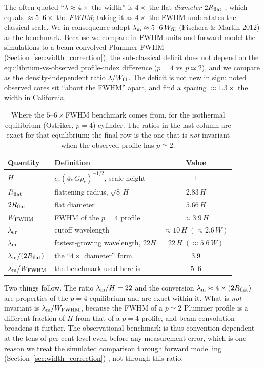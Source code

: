 \documentclass[usenatbib,twoside,twocolumn]{mnras}
\begin{document}
\smallskip The often-quoted ``$\lambda\approx4\times$ the width'' is $4\times$ the flat \emph{diameter} $2R_{\rm flat}$ \citep{Inutsuka1992}, which equals $\approx5$--$6\times$ the \emph{FWHM}; taking it as $4\times$ the FWHM understates the classical scale. We in consequence adopt $\lambda_{\rm m}\approx5$--$6\,W_{\rm fil}$ (Fischera \& Martin 2012) as the benchmark. Because we compare in FWHM units and forward-model the simulations to a beam-convolved Plummer FWHM (Section~\ref{sec:width_correction}), the sub-classical deficit does not depend on the equilibrium-vs-observed profile-index difference ($p=4$ vs $p\simeq2$), and we compare as the density-independent ratio $\lambda/W_{\rm fil}$. The deficit is not new in sign: \citet{Fischera2012} noted observed cores sit ``about the FWHM'' apart, and \citet{Zhang2023cal} find a spacing $\approx1.3\times$ the width in California.

\begin{table}
\caption{Where the $5$--$6\times$FWHM benchmark comes from, for the isothermal equilibrium (Ostriker, $p=4$) cylinder. The ratios in the last column are exact for that equilibrium; the final row is the one that is \emph{not} invariant when the observed profile has $p\simeq2$.}
\label{tab:benchmark}
\footnotesize
\setlength{\tabcolsep}{4pt}
\begin{tabular}{llc}
\toprule
Quantity & Definition & Value \\
\midrule
$H$ & $c_s(4\pi G\rho_c)^{-1/2}$, scale height & $1$ \\
$R_{\rm flat}$ & flattening radius, $\sqrt{8}\,H$ & $2.83\,H$ \\
$2R_{\rm flat}$ & flat diameter & $5.66\,H$ \\
$W_{\rm FWHM}$ & FWHM of the $p=4$ profile & $\approx3.9\,H$ \\
$\lambda_{\rm cr}$ & cutoff wavelength & $\approx10\,H\;(\approx2.6\,W)$ \\
$\lambda_{\rm m}$ & fastest-growing wavelength, $22H$ & $22\,H\;(\approx5.6\,W)$ \\
\midrule
$\lambda_{\rm m}/(2R_{\rm flat})$ & the ``$4\times$ diameter'' form & $3.9$ \\
$\lambda_{\rm m}/W_{\rm FWHM}$ & the benchmark used here is & $5$--$6$ \\
\bottomrule
\end{tabular}
\end{table}

Two things follow. The ratio $\lambda_{\rm m}/H=22$ and the conversion $\lambda_{\rm m}\approx4\times(2R_{\rm flat})$ are properties of the $p=4$ equilibrium and are exact within it. What is \emph{not} invariant is $\lambda_{\rm m}/W_{\rm FWHM}$, because the FWHM of a $p\simeq2$ Plummer profile is a different fraction of $H$ from that of a $p=4$ profile, and beam convolution broadens it further. The observational benchmark is thus convention-dependent at the tens-of-per-cent level even before any measurement error, which is one reason we treat the simulated comparison through forward modelling (Section~\ref{sec:width_correction}) , not through this ratio.
\end{document}
